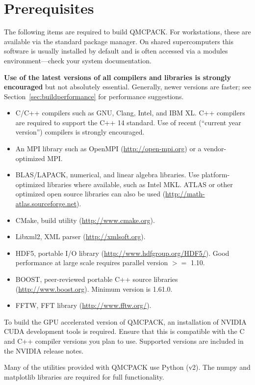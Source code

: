 \section{Prerequisites}
\label{sec:prerequisites}
The following items are required to build QMCPACK. For workstations, these are available via the standard
package manager. On shared supercomputers this software is usually
installed by default and is often
accessed via a modules environment---check your system
documentation.

\textbf{Use of the latest versions of all compilers and libraries is
strongly encouraged} but not absolutely essential. Generally, newer versions are faster; see
Section~\ref{sec:buildperformance} for performance suggestions.

\begin{itemize}
\item C/C++ compilers such as GNU, Clang, Intel, and IBM XL. C++ compilers
  are required to support the C++ 14 standard. Use of recent (``current
  year version'') compilers is strongly encouraged.
\item An MPI library such as OpenMPI (\url{http://open-mpi.org}) or a vendor-optimized MPI.
\item BLAS/LAPACK, numerical, and linear algebra libraries. Use
  platform-optimized libraries where available, such as Intel MKL.
  ATLAS or other optimized open source libraries can also be used
  (\url{http://math-atlas.sourceforge.net}).
\item CMake, build utility (\url{http://www.cmake.org}).
\item Libxml2, XML parser (\url{http://xmlsoft.org}).
\item HDF5, portable I/O library (\url{http://www.hdfgroup.org/HDF5/}). Good performance at large scale requires parallel version $>=$ 1.10.
\item BOOST, peer-reviewed portable C++ source libraries  (\url{http://www.boost.org}).   Minimum version is 1.61.0.
\item FFTW, FFT library (\url{http://www.fftw.org/}).
\end{itemize}

To build the GPU accelerated version of QMCPACK, an installation of
NVIDIA CUDA development tools is required. Ensure that this is
compatible with the C and C++ compiler versions you plan to
use. Supported versions are included in the NVIDIA release notes.

Many of the utilities provided with QMCPACK use Python (v2). The numpy
and matplotlib libraries are required for full functionality.

